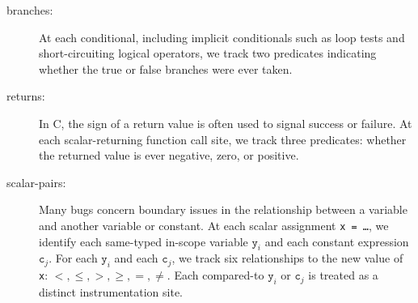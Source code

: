 \documentclass[draft]{sig-alternate}
\newcommand{\issue}[2][]{}
\begin{document}
\begin{description}
\sloppy
\item[branches:] At each conditional, including implicit conditionals
such as loop tests and short-circuiting logical operators, we track two predicates
indicating whether the true or false branches were ever taken.

\item[returns:] In C, the
  sign of a return value is often used to signal success or failure.
  At each scalar-returning function call site, we track three predicates:
  whether the returned value is ever negative, zero, or positive.  
  \issue[Mayur]{ returns: ... We track three predicates: ...

    $\leftarrow$

    returns: ... We track six predicate: ...
    
    We should make the explanation of the returns scheme very similar
    to that of the scalar-pairs scheme.}

\item[scalar-pairs:] Many bugs
  concern boundary issues in the relationship between a 
  variable and another variable or constant.  At
  each scalar assignment \texttt{x = \dots}, we identify each
  same-typed in-scope variable $\mathtt{y}_i$ and each
  constant expression $\mathtt{c}_j$.  For each   $\mathtt{y}_i$ and each $\mathtt{c}_j$,  
  we track six relationships to the new value of \texttt{x}: $<, \leq, >, \geq, =, \neq$.
Each compared-to $\mathtt{y}_i$
  or $\mathtt{c}_j$ is treated as a distinct instrumentation site.
  \issue[Alice]{Changed to "we identify" to match the next sentence.}
\end{description}

\issue[Mayur]{General comment on all three scheme descriptions:

  We should mention somewhere that the predicates within a site are
  *not* sampled independently, that is, if we decide to sample a site,
  then we record the value of each predicate at that site.  In a
  related comment, maybe we should also mention the constraint on each
  scheme that for every predicate P that it produces, there must be a
  predicate !P.

  These are natural properties to check and provide good coverage of a
  program's scalar values and control flow.  This set is by no means
  complete, however; in particular, it would be useful to have
  predicates on heap structures as well.}
\end{document}
